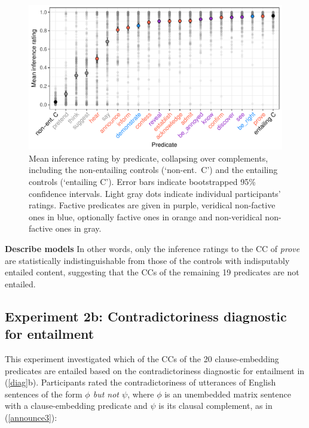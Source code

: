 \documentclass[11pt,fleqn]{article}
\newcommand{\6}{\mbox{$[\hspace*{-.6mm}[$}}
\newcommand{\9}{\mbox{$]\hspace*{-.6mm}]$}}
\begin{document}
\begin{figure}[h!]
\centering

\includegraphics[width=.7\paperwidth]{../results/4-veridicality3/graphs/means-inference-by-predicate-variability}

\caption{Mean inference rating by predicate, collapsing over complements, including the non-entailing controls (`non-ent.\ C') and the entailing controls (`entailing C'). Error bars indicate bootstrapped 95\% confidence intervals. Light gray dots indicate individual participants' ratings. Factive predicates are given in purple, veridical non-factive ones in blue, optionally factive ones in orange and non-veridical non-factive ones in gray.}
\label{f-veridicality-predicate}
\end{figure}

{\bf Describe models} In other words, only the inference ratings to the CC of {\em prove} are statistically indistinguishable from those of the controls with indisputably entailed content, suggesting that the CCs of the remaining 19 predicates are not entailed.



\subsection{Experiment 2b: Contradictoriness diagnostic for entailment}\label{s32}

This experiment investigated which of the CCs of the 20 clause-embedding predicates are entailed based on the contradictoriness diagnostic for entailment in (\ref{diag}b). Participants rated the contradictoriness of utterances of English sentences of the form {\em $\phi$ but not $\psi$}, where $\phi$ is an unembedded matrix sentence with a clause-embedding predicate and $\psi$ is its clausal complement, as in (\ref{announce3}):
\end{document}
